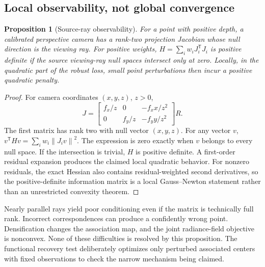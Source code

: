 \documentclass[10pt,twocolumn,letterpaper]{article}
\newtheorem{proposition}{Proposition}
\newcommand{\norm}[1]{\left\lVert#1\right\rVert}
\begin{document}
\subsection{Local observability, not global convergence}
\begin{proposition}[Source-ray observability]
For a point with positive depth, a calibrated perspective camera has a rank-two projection Jacobian whose null direction is the viewing ray. For positive weights, $H=\sum_i w_iJ_i^{\mathsf T}J_i$ is positive definite if the source viewing-ray null spaces intersect only at zero. Locally, in the quadratic part of the robust loss, small point perturbations then incur a positive quadratic penalty.
\end{proposition}
\begin{proof}
For camera coordinates $(x,y,z)$, $z>0$,
\begin{equation}
J=\begin{bmatrix}f_x/z&0&-f_xx/z^2\\0&f_y/z&-f_yy/z^2\end{bmatrix}R.
\label{eq:jacobian}
\end{equation}
The first matrix has rank two with null vector $(x,y,z)$. For any vector $v$, $v^{\mathsf T}Hv=\sum_i w_i\norm{J_iv}^2$. The expression is zero exactly when $v$ belongs to every null space. If the intersection is trivial, $H$ is positive definite. A first-order residual expansion produces the claimed local quadratic behavior. For nonzero residuals, the exact Hessian also contains residual-weighted second derivatives, so the positive-definite information matrix is a local Gauss--Newton statement rather than an unrestricted convexity theorem.
\end{proof}
Nearly parallel rays yield poor conditioning even if the matrix is technically full rank. Incorrect correspondences can produce a confidently wrong point. Densification changes the association map, and the joint radiance-field objective is nonconvex. None of these difficulties is resolved by this proposition. The functional recovery test deliberately optimizes only perturbed associated centers with fixed observations to check the narrow mechanism being claimed.
\end{document}

